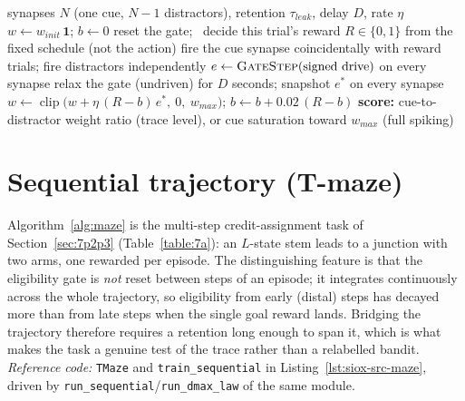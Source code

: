 \begin{algorithm}[htbp!]
\caption{Open-loop distal-reward credit assignment (one seed).}
\label{alg:distal}
\begin{algorithmic}[1]
\Require synapses $N$ (one cue, $N\!-\!1$ distractors), retention $\tau_{leak}$, delay $D$, rate $\eta$
\State $w \gets w_{init}\,\mathbf{1}$; \quad $b \gets 0$
    \State reset the gate; \ decide this trial's reward $R\in\{0,1\}$ from the fixed schedule (not the action)
        \State fire the cue synapse coincidentally with reward trials; fire distractors independently
        \State $e \gets \textsc{GateStep}(\text{signed drive})$ on every synapse 
    \EndFor
    \State relax the gate (undriven) for $D$ seconds; snapshot $e^{\ast}$ on every synapse
    \State $w \gets \operatorname{clip}\!\big(w + \eta\,(R-b)\,e^{\ast},\ 0,\ w_{max}\big)$; \quad $b \gets b + 0.02\,(R-b)$
\EndFor
\State \textbf{score:} cue-to-distractor weight ratio (trace level), or cue saturation toward $w_{max}$ (full spiking)
\end{algorithmic}
\end{algorithm}

\section{Sequential trajectory (T-maze)}
\label{app:alg-maze}

\noindent Algorithm~\ref{alg:maze} is the multi-step credit-assignment task of
Section~\ref{sec:7p2p3} (Table~\ref{table:7a}): an $L$-state stem leads to a junction
with two arms, one rewarded per episode. The distinguishing feature is that the
eligibility gate is \emph{not} reset between steps of an episode; it integrates
continuously across the whole trajectory, so eligibility from early (distal) steps has
decayed more than from late steps when the single goal reward lands. Bridging the
trajectory therefore requires a retention long enough to span it, which is what makes
the task a genuine test of the trace rather than a relabelled bandit. \emph{Reference
code:} \texttt{TMaze} and \texttt{train\_sequential} in Listing~\ref{lst:siox-src-maze},
driven by \texttt{run\_sequential}/\texttt{run\_dmax\_law} of the same module.

